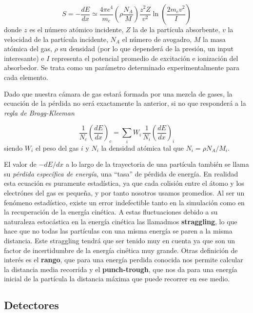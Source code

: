 \begin{equation}
	S = - \frac{dE}{dx} \simeq \frac{4 \pi e^4}{m_e} \left( \rho \frac{N_A}{M} \right) \frac{z^2 Z}{v^2} \ln \left( \frac{2 m_e v^2}{I} \right)
\end{equation}
donde $z$ es el número atómico incidente, $Z$ la de la partícula absorbente, $v$ la velocidad de la partícula incidente, $N_A$ el número de avogadro, $M$ la masa atómica del gas, $\rho$ su densidad (por lo que dependerá de la presión, un input interesante) e $I$  representa el potencial promedio de excitación e ionización del absorbedor. Se trata como un parámetro determinado experimentalmente para cada elemento.

Dado que nuestra cámara de gas estará formada por una mezcla de gases, la ecuación de la pérdida no será exactamente la anterior, si no que responderá a la \textit{regla de Bragg-Kleeman} \cite{Knoll:1300754}

\begin{equation}
	\frac{1}{N_c} \left( \frac{dE}{dx} \right)_c = \sum_i W_i \, \frac{1}{N_i} \left( \frac{dE}{dx} \right)_i
\end{equation}
siendo $W_i$ el peso del gas $i$ y $N_i$ la densidad atómica tal que $N_i = \rho N_A
	/ M_i$.

El valor de \( -dE/dx \) a lo largo de la trayectoria de una partícula también se llama su \textit{pérdida específica de energía}, una ``tasa'' de pérdida de energía. En realidad esta ecuación es puramente estadística, ya que cada colisión entre el átomo y los electrónes del gas es pequeña, y por tanto nosotros usamos promedios. Al ser un fenómeno estadístico, existe un error indefectible tanto en la simulación como en la recuperación de la energía cinética. A estas fluctuaciones debido a su naturaleza estocástica en la energía cinética las llamadmos \textbf{straggling}, lo que hace que no todas las partículas con una misma energía se paren a la misma distancia. Este straggling tendrá que ser tenido muy en cuenta ya que son un factor de incertidumbre de la energía cinética muy grande. Otras definición de interés es el \textbf{rango}, que para una energía perdida conocida nos permite calcular la distancia media recorrida y el \textbf{punch-trough}, que nos da para una energía inicial de la partícula la distancia máxima que puede recorrer en ese medio.


\subsection{Detectores}

